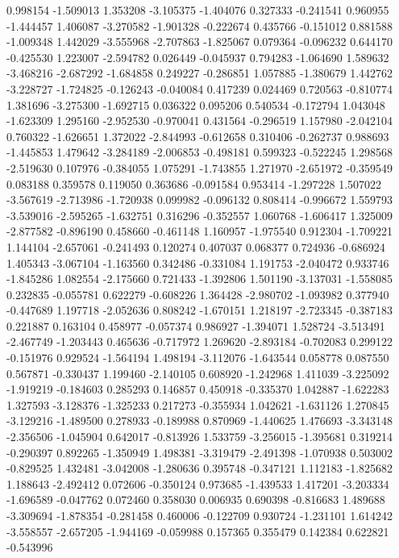 0.998154
-1.509013
1.353208
-3.105375
-1.404076
0.327333
-0.241541
0.960955
-1.444457
1.406087
-3.270582
-1.901328
-0.222674
0.435766
-0.151012
0.881588
-1.009348
1.442029
-3.555968
-2.707863
-1.825067
0.079364
-0.096232
0.644170
-0.425530
1.223007
-2.594782
0.026449
-0.045937
0.794283
-1.064690
1.589632
-3.468216
-2.687292
-1.684858
0.249227
-0.286851
1.057885
-1.380679
1.442762
-3.228727
-1.724825
-0.126243
-0.040084
0.417239
0.024469
0.720563
-0.810774
1.381696
-3.275300
-1.692715
0.036322
0.095206
0.540534
-0.172794
1.043048
-1.623309
1.295160
-2.952530
-0.970041
0.431564
-0.296519
1.157980
-2.042104
0.760322
-1.626651
1.372022
-2.844993
-0.612658
0.310406
-0.262737
0.988693
-1.445853
1.479642
-3.284189
-2.006853
-0.498181
0.599323
-0.522245
1.298568
-2.519630
0.107976
-0.384055
1.075291
-1.743855
1.271970
-2.651972
-0.359549
0.083188
0.359578
0.119050
0.363686
-0.091584
0.953414
-1.297228
1.507022
-3.567619
-2.713986
-1.720938
0.099982
-0.096132
0.808414
-0.996672
1.559793
-3.539016
-2.595265
-1.632751
0.316296
-0.352557
1.060768
-1.606417
1.325009
-2.877582
-0.896190
0.458660
-0.461148
1.160957
-1.975540
0.912304
-1.709221
1.144104
-2.657061
-0.241493
0.120274
0.407037
0.068377
0.724936
-0.686924
1.405343
-3.067104
-1.163560
0.342486
-0.331084
1.191753
-2.040472
0.933746
-1.845286
1.082554
-2.175660
0.721433
-1.392806
1.501190
-3.137031
-1.558085
0.232835
-0.055781
0.622279
-0.608226
1.364428
-2.980702
-1.093982
0.377940
-0.447689
1.197718
-2.052636
0.808242
-1.670151
1.218197
-2.723345
-0.387183
0.221887
0.163104
0.458977
-0.057374
0.986927
-1.394071
1.528724
-3.513491
-2.467749
-1.203443
0.465636
-0.717972
1.269620
-2.893184
-0.702083
0.299122
-0.151976
0.929524
-1.564194
1.498194
-3.112076
-1.643544
0.058778
0.087550
0.567871
-0.330437
1.199460
-2.140105
0.608920
-1.242968
1.411039
-3.225092
-1.919219
-0.184603
0.285293
0.146857
0.450918
-0.335370
1.042887
-1.622283
1.327593
-3.128376
-1.325233
0.217273
-0.355934
1.042621
-1.631126
1.270845
-3.129216
-1.489500
0.278933
-0.189988
0.870969
-1.440625
1.476693
-3.343148
-2.356506
-1.045904
0.642017
-0.813926
1.533759
-3.256015
-1.395681
0.319214
-0.290397
0.892265
-1.350949
1.498381
-3.319479
-2.491398
-1.070938
0.503002
-0.829525
1.432481
-3.042008
-1.280636
0.395748
-0.347121
1.112183
-1.825682
1.188643
-2.492412
0.072606
-0.350124
0.973685
-1.439533
1.417201
-3.203334
-1.696589
-0.047762
0.072460
0.358030
0.006935
0.690398
-0.816683
1.489688
-3.309694
-1.878354
-0.281458
0.460006
-0.122709
0.930724
-1.231101
1.614242
-3.558557
-2.657205
-1.944169
-0.059988
0.157365
0.355479
0.142384
0.622821
-0.543996
